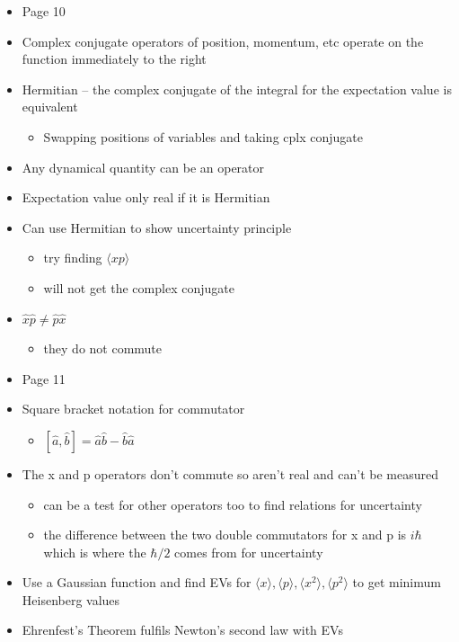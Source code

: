 \documentclass[a4paper,11pt,normalem]{article}
\begin{document}
\begin{itemize}
\item
  Page 10
\item
  Complex conjugate operators of position, momentum, etc operate on the
  function immediately to the right
\item
  Hermitian -- the complex conjugate of the integral for the expectation
  value is equivalent
  \begin{itemize}
  \item
    Swapping positions of variables and taking cplx conjugate
  \end{itemize}
\item
  Any dynamical quantity can be an operator
\item
  Expectation value only real if it is Hermitian
\item
  Can use Hermitian to show uncertainty principle
  \begin{itemize}
  \item
    try finding \(\langle xp\rangle\)
  \item
    will not get the complex conjugate
  \end{itemize}
\item
  \(\hat{x}\hat{p} \neq \hat{p}\hat{x}\)
  \begin{itemize}
  \item
    they do not commute
  \end{itemize}
\item
  Page 11
\item
  Square bracket notation for commutator
  \begin{itemize}
  \item
    \([\hat{a},\hat{b}] = \hat{a}\hat{b} - \hat{b}\hat{a}\)
  \end{itemize}
\item
  The x and p operators don't commute so aren't real and can't be
  measured
  \begin{itemize}
  \item
    can be a test for other operators too to find relations for
    uncertainty
  \item
    the difference between the two double commutators for x and p is
    $i\hbar$ which is where the $\hbar/2$ comes from for uncertainty
  \end{itemize}
\item
  Use a Gaussian function and find EVs for
  \(\langle x \rangle , \langle p \rangle , \langle x^2 \rangle , \langle p^2 \rangle\)
  to get minimum Heisenberg values
\item
  Ehrenfest's Theorem fulfils Newton's second law with EVs
\end{itemize}
\end{document}
